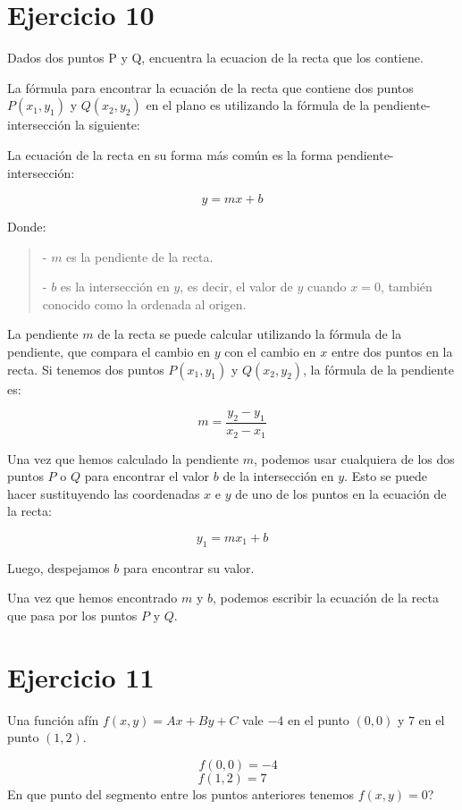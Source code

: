 \documentclass{article}
\begin{document}
\section*{Ejercicio 10}
Dados dos puntos P y Q, encuentra la ecuacion de la recta que
los contiene.

\noindent La fórmula para encontrar la ecuación de la recta 
que contiene dos puntos \( P(x_1, y_1) \) y \( Q(x_2, y_2) \) 
en el plano es utilizando la fórmula de la pendiente-intersección
 la siguiente:

La ecuación de la recta en su forma más común es 
la forma pendiente-intersección:

\[ y = mx + b \]

Donde:
\begin{quote}
   - \( m \) es la pendiente de la recta.

   -   \( b \) es la intersección en \( y \), 
   es decir, el valor de \( y \) cuando \( x = 0 \), 
   también conocido como la ordenada al origen.
\end{quote}

La pendiente \( m \) de la recta se puede calcular utilizando 
la fórmula de la pendiente, que compara el cambio en \( y \) 
con el cambio en \( x \) entre dos puntos en la recta. 
Si tenemos dos puntos \( P(x_1, y_1) \) y \( Q(x_2, y_2) \), 
la fórmula de la pendiente es:

\[ m = \frac{{y_2 - y_1}}{{x_2 - x_1}} \]

Una vez que hemos calculado la pendiente \( m \), 
podemos usar cualquiera de los dos puntos \( P \) o \( Q \)
 para encontrar el valor \( b \) de la intersección en \( y \).
  Esto se puede hacer sustituyendo las coordenadas \( x \) e \( y \) 
  de uno de los puntos en la ecuación de la recta:

\[ y_1 = mx_1 + b \]

Luego, despejamos \( b \) para encontrar su valor.

Una vez que hemos encontrado \( m \) y \( b \), 
podemos escribir la ecuación de la recta que pasa por
 los puntos \( P \) y \( Q \).


\section*{Ejercicio 11}
Una función afín $f(x, y) = Ax + By + C$ vale $-4$ en el punto
$(0, 0)$ y $7$ en el punto $(1, 2)$.

$$\,\,\,\;\,f(0, 0) = -4$$
$$f(1, 2) = 7$$
En que punto del segmento entre los puntos anteriores tenemos
$f(x, y) = 0$?
\end{document}
